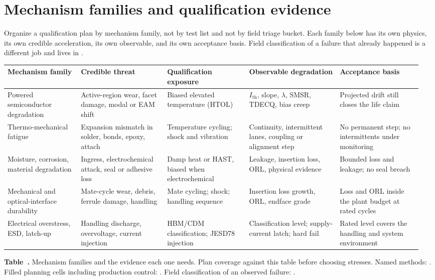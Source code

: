 \section{Mechanism families and qualification evidence}
\label{sec:wearout-modes}

Organize a qualification plan by mechanism family, not by test list and not by
field triage bucket. Each family below has its own physics, its own credible
acceleration, its own observable, and its own acceptance basis. Field
classification of a failure that already happened is a different job and lives
in .

\begin{table}[ht]
\label{tab:qual-mechanism-families}\label{tab:wearout-map}%
\centering
\setlength{\tabcolsep}{3pt}%
\footnotesize
\renewcommand{\arraystretch}{1.25}%
\begin{tabular}{@{}p{0.17\linewidth}p{0.20\linewidth}p{0.19\linewidth}p{0.21\linewidth}p{0.19\linewidth}@{}}
\toprule
Mechanism family & Credible threat & Qualification exposure & Observable degradation & Acceptance basis \\
\midrule
Powered semiconductor degradation & Active-region wear, facet damage, modal or EAM shift & Biased elevated temperature (HTOL) & $I_\mathrm{th}$, slope, $\lambda$, SMSR, TDECQ, bias creep & Projected drift still closes the life claim \\
\addlinespace[1.2em]
Thermo-mechanical fatigue & Expansion mismatch in solder, bonds, epoxy, attach & Temperature cycling; shock and vibration & Continuity, intermittent lanes, coupling or alignment step & No permanent step; no intermittents under monitoring \\
\addlinespace[1.2em]
Moisture, corrosion, material degradation & Ingress, electrochemical attack, seal or adhesive loss & Damp heat or HAST, biased when electrochemical & Leakage, insertion loss, ORL, physical evidence & Bounded loss and leakage; no seal breach \\
\addlinespace[1.2em]
Mechanical and optical-interface durability & Mate-cycle wear, debris, ferrule damage, handling & Mate cycling; shock; handling sequence & Insertion loss growth, ORL, endface grade & Loss and ORL inside the plant budget at rated cycles \\
\addlinespace[1.2em]
Electrical overstress, ESD, latch-up & Handling discharge, overvoltage, current injection & HBM/CDM classification; JESD78 injection & Classification level; supply-current latch; hard fail & Rated level covers the handling and system environment \\
\bottomrule
\end{tabular}
\par\medskip
{\raggedright\footnotesize\textbf{Table~\thetable.} Mechanism families and the
evidence each one needs. Plan coverage against this table before choosing
stresses. Named methods: . Filled planning
cells including production control: . Field
classification of an observed failure: .\par}
\end{table}
\FloatBarrier

